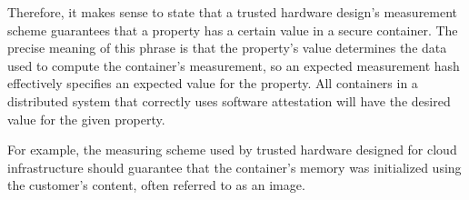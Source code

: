 Therefore, it makes sense to state that a trusted hardware design's measurement
scheme guarantees that a property has a certain value in a secure container.
The precise meaning of this phrase is that the property's value determines the
data used to compute the container's measurement, so an expected measurement
hash effectively specifies an expected value for the property. All containers in
a distributed system that correctly uses software attestation will have the
desired value for the given property.

For example, the measuring scheme used by trusted hardware designed for cloud
infrastructure should guarantee that the container's memory was initialized
using the customer's content, often referred to as an image.
